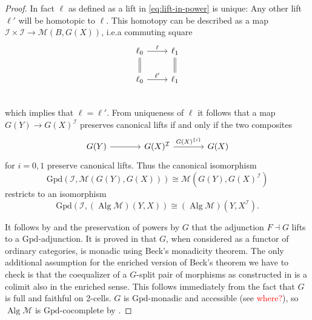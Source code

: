 \documentclass{article}
\newcommand{\todo}[1]{\textcolor{red}{#1}}
\theoremstyle{remark}
\theoremstyle{definition}
\begin{document}
\begin{proof}
  In fact $\ell$ as defined as a lift in \eqref{eq:lift-in-power} is unique:
  Any other lift $\ell'$ will be homotopic to $\ell$.
  This homotopy can be described as a map $\mathcal{I} \times \mathcal{I} \rightarrow \mathcal{M}(B, G(X))$, i.e.\@ a commuting square
  \begin{equation}
    \begin{tikzcd}
      \ell_0 \arrow[r, "\ell"] \arrow[d, equals] & \ell_1 \arrow[d, equals] \\
      \ell_0 \arrow[r, "\ell'"] & \ell_1 \\
    \end{tikzcd}
  \end{equation}
  which implies that $\ell = \ell'$.
  From uniqueness of $\ell$ it follows that a map $G(Y) \rightarrow G(X)^\mathcal{I}$ preserves canonical lifts if and only if the two composites
  \begin{equation}
    \begin{tikzcd}[column sep=large]
      G(Y) \arrow[r] & G(X)^\mathcal{I} \arrow[r, "G(X)^{\{i\}}"] & G(X)
    \end{tikzcd}
  \end{equation}
  for $i = 0, 1$ preserve canonical lifts.
  Thus the canonical isomorphism
  \begin{equation}
    \mathrm{Gpd}(\mathcal{I}, \mathcal{M}(G(Y), G(X))) \cong \mathcal{M}(G(Y), G(X)^\mathcal{I})
  \end{equation}
  restricts to an isomorphism
  \begin{equation}
    \mathrm{Gpd}(\mathcal{I}, (\operatorname{Alg} \mathcal{M})(Y, X)) \cong (\operatorname{Alg} \mathcal{M})(Y, X^\mathcal{I}).
  \end{equation}

  It follows by \cite[theorem 4.85]{basic-concepts-of-enriched-category-theory} and the preservation of powers by $G$ that the adjunction $F \dashv G$ lifts to a $\mathrm{Gpd}$-adjunction.
  It is proved in \cite{algebraic-models} that $G$, when considered as a functor of ordinary categories, is monadic using Beck's monadicity theorem.
  The only additional assumption for the enriched version of Beck's theorem \cite[theorem II.2.1]{enriched-kan-extensions} we have to check is that the coequalizer of a $G$-split pair of morphisms as constructed in \cite{algebraic-models} is a colimit also in the enriched sense.
  This follows immediately from the fact that $G$ is full and faithful on 2-cells.
  $G$ is $\mathrm{Gpd}$-monadic and accessible (see \todo{where?}), so $\operatorname{Alg} \mathcal{M}$ is $\mathrm{Gpd}$-cocomplete by \cite[theorem 3.8]{two-dimensional-monad-theory}.


\end{proof}
\end{document}
